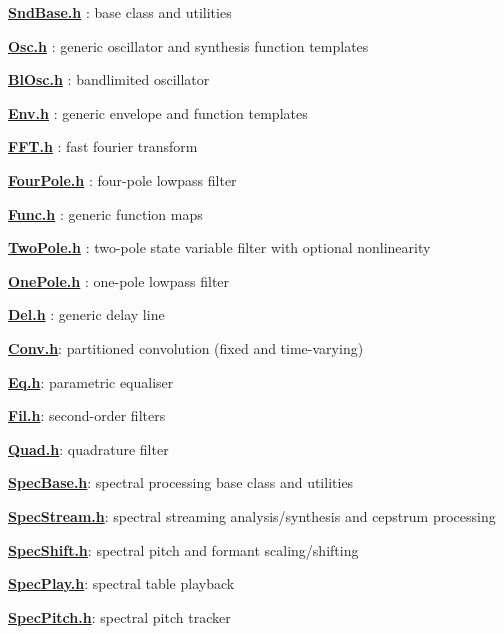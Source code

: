 \label{index_md_include_README}%
%


{\bfseries{\mbox{\hyperlink{_snd_base_8h}{Snd\+Base.\+h}}}} \+: base class and utilities

{\bfseries{\mbox{\hyperlink{_osc_8h}{Osc.\+h}}}} \+: generic oscillator and synthesis function templates

{\bfseries{\mbox{\hyperlink{_bl_osc_8h}{Bl\+Osc.\+h}}}} \+: bandlimited oscillator

{\bfseries{\mbox{\hyperlink{_env_8h}{Env.\+h}}}} \+: generic envelope and function templates

{\bfseries{\mbox{\hyperlink{_f_f_t_8h}{FFT.\+h}}}} \+: fast fourier transform

{\bfseries{\mbox{\hyperlink{_four_pole_8h}{Four\+Pole.\+h}}}} \+: four-\/pole lowpass filter

{\bfseries{\mbox{\hyperlink{_func_8h}{Func.\+h}}}} \+: generic function maps

{\bfseries{\mbox{\hyperlink{_two_pole_8h}{Two\+Pole.\+h}}}} \+: two-\/pole state variable filter with optional nonlinearity

{\bfseries{\mbox{\hyperlink{_one_pole_8h}{One\+Pole.\+h}}}} \+: one-\/pole lowpass filter

{\bfseries{\mbox{\hyperlink{_del_8h}{Del.\+h}}}} \+: generic delay line

{\bfseries{\mbox{\hyperlink{_conv_8h}{Conv.\+h}}}}\+: partitioned convolution (fixed and time-\/varying)

{\bfseries{\mbox{\hyperlink{_eq_8h}{Eq.\+h}}}}\+: parametric equaliser

{\bfseries{\mbox{\hyperlink{_fil_8h}{Fil.\+h}}}}\+: second-\/order filters

{\bfseries{\mbox{\hyperlink{_quad_8h}{Quad.\+h}}}}\+: quadrature filter

{\bfseries{\mbox{\hyperlink{_spec_base_8h}{Spec\+Base.\+h}}}}\+: spectral processing base class and utilities

{\bfseries{\mbox{\hyperlink{_spec_stream_8h}{Spec\+Stream.\+h}}}}\+: spectral streaming analysis/synthesis and cepstrum processing

{\bfseries{\mbox{\hyperlink{_spec_shift_8h}{Spec\+Shift.\+h}}}}\+: spectral pitch and formant scaling/shifting

{\bfseries{\mbox{\hyperlink{_spec_play_8h}{Spec\+Play.\+h}}}}\+: spectral table playback

{\bfseries{\mbox{\hyperlink{_spec_pitch_8h}{Spec\+Pitch.\+h}}}}\+: spectral pitch tracker 